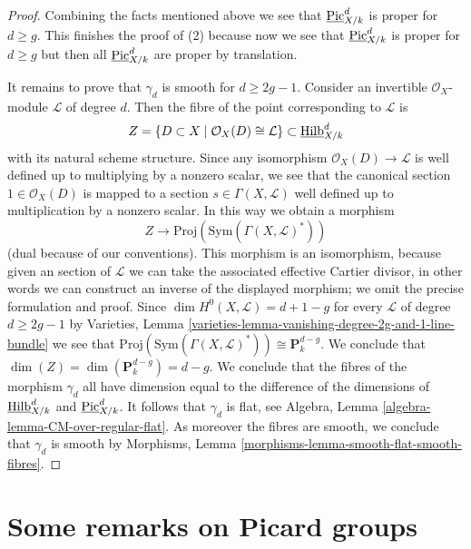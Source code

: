 \begin{proof}
\medskip\noindent
Combining the facts mentioned above we see that
$\underline{\mathrm{Pic}}^d_{X/k}$ is proper for $d \geq g$.
This finishes the proof of (2) because now we see that
$\underline{\mathrm{Pic}}^d_{X/k}$ is proper for $d \geq g$ but
then all $\underline{\mathrm{Pic}}^d_{X/k}$ are proper by translation.

\medskip\noindent
It remains to prove that $\gamma_d$ is smooth for $d \geq 2g - 1$.
Consider an invertible $\mathcal{O}_X$-module $\mathcal{L}$ of degree
$d$. Then the fibre of the point corresponding to $\mathcal{L}$ is
$$
Z = \{D \subset X \mid \mathcal{O}_X(D) \cong \mathcal{L}\} \subset
\underline{\mathrm{Hilb}}^d_{X/k}
$$
with its natural scheme structure. Since any isomorphism
$\mathcal{O}_X(D) \to \mathcal{L}$ is well defined up
to multiplying by a nonzero scalar, we see that the canonical
section $1 \in \mathcal{O}_X(D)$ is mapped to a section
$s \in \Gamma(X, \mathcal{L})$ well defined up to multiplication
by a nonzero scalar. In this way we obtain a morphism
$$
Z \longrightarrow
\text{Proj}(\text{Sym}(\Gamma(X, \mathcal{L})^*))
$$
(dual because of our conventions). This morphism is an isomorphism,
because given an section of $\mathcal{L}$ we can take the associated
effective Cartier divisor, in other words we can construct an inverse of
the displayed morphism; we omit the precise formulation and proof.
Since $\dim H^0(X, \mathcal{L}) = d + 1 - g$ for every
$\mathcal{L}$ of degree $d \geq 2g - 1$ by
Varieties, Lemma \ref{varieties-lemma-vanishing-degree-2g-and-1-line-bundle}
we see that $\text{Proj}(\text{Sym}(\Gamma(X, \mathcal{L})^*))
\cong \mathbf{P}^{d - g}_k$.
We conclude that $\dim(Z) = \dim(\mathbf{P}^{d - g}_k) = d - g$.
We conclude that the fibres of the morphism $\gamma_d$ all
have dimension equal to the difference of the dimensions of
$\underline{\mathrm{Hilb}}^d_{X/k}$ and $\underline{\mathrm{Pic}}^d_{X/k}$.
It follows that $\gamma_d$ is flat, see
Algebra, Lemma \ref{algebra-lemma-CM-over-regular-flat}.
As moreover the fibres are smooth, we conclude that $\gamma_d$
is smooth by Morphisms, Lemma \ref{morphisms-lemma-smooth-flat-smooth-fibres}.
\end{proof}





\section{Some remarks on Picard groups}
\label{section-remarks-picard}

